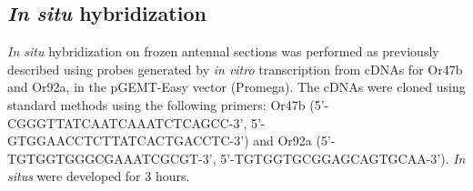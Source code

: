 \subsection*{\emph{In situ} hybridization}

\emph{In situ} hybridization on frozen antennal sections was performed as previously described \cite{ein_Morozov_Rzhetsky_Axel_1999} using probes generated by \emph{in vitro} transcription from cDNAs for Or47b and Or92a, in the pGEMT-Easy vector (Promega).
The cDNAs were cloned using standard methods using the following primers: Or47b (5'-CGGGTTATCAATCAAATCTCAGCC-3', 5'-GTGGAACCTCTTATCACTGACCTC-3') and Or92a (5'-TGTGGTGGGCGAAATCGCGT-3', 5'-TGTGGTGCGGAGCAGTGCAA-3').
\emph{In situs} were developed for 3 hours.